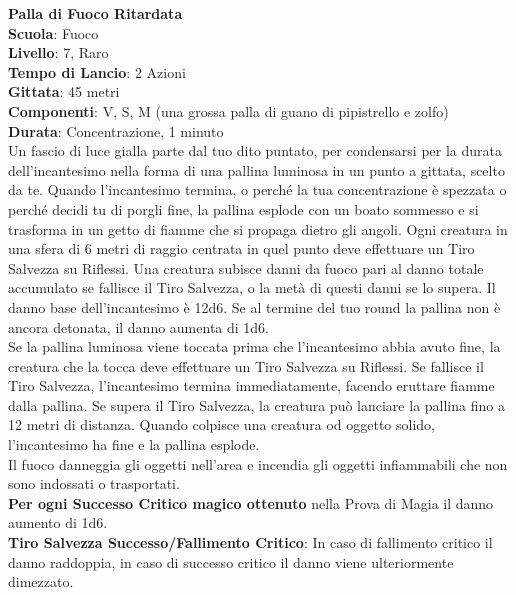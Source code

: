 \begin{multicols}{2}
\medskip\textbf{Palla di Fuoco Ritardata}\\
\textbf{Scuola}: Fuoco\\
\textbf{Livello}: 7, Raro\\
\textbf{Tempo di Lancio}: 2 Azioni\\
\textbf{Gittata}: 45 metri\\
\textbf{Componenti}: V, S, M (una grossa palla di guano di pipistrello e zolfo)\\
\textbf{Durata}: Concentrazione, 1 minuto\\
Un fascio di luce gialla parte dal tuo dito puntato, per condensarsi per la durata dell'incantesimo nella forma di una pallina luminosa in un punto a gittata, scelto da te. Quando l'incantesimo termina, o perché la tua concentrazione è spezzata o perché decidi tu di porgli fine, la pallina esplode con un boato sommesso e si trasforma in un getto di fiamme che si propaga dietro gli angoli. Ogni creatura in una sfera di 6 metri di raggio centrata in quel punto deve effettuare un Tiro Salvezza su Riflessi. Una creatura subisce danni da fuoco pari al danno totale accumulato se fallisce il Tiro Salvezza, o la metà di questi danni se lo supera. Il danno base dell'incantesimo è 12d6. Se al termine del tuo round la pallina non è ancora detonata, il danno aumenta di 1d6.\\
Se la pallina luminosa viene toccata prima che l'incantesimo abbia avuto fine, la creatura che la tocca deve effettuare un Tiro Salvezza su Riflessi. Se fallisce il Tiro Salvezza, l'incantesimo termina immediatamente, facendo eruttare fiamme dalla pallina. Se supera il Tiro Salvezza, la creatura può lanciare la pallina fino a 12 metri di distanza. Quando colpisce una creatura od oggetto solido, l'incantesimo ha fine e la pallina esplode.\\
Il fuoco danneggia gli oggetti nell'area e incendia gli oggetti infiammabili che non sono indossati o trasportati.\\
\textbf{Per ogni Successo Critico magico ottenuto} nella Prova di Magia il danno aumento di 1d6.\\
\textbf{Tiro Salvezza Successo/Fallimento Critico}: In caso di fallimento critico il danno raddoppia, in caso di successo critico il danno viene ulteriormente dimezzato.


\end{multicols}
